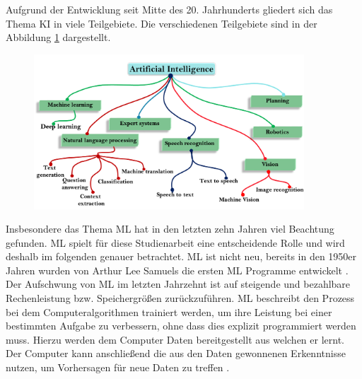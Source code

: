 Aufgrund der Entwicklung seit Mitte des 20. Jahrhunderts gliedert sich das Thema \ac{KI} in viele Teilgebiete.
Die verschiedenen Teilgebiete sind in der Abbildung \ref{fig:KI-Teilgebiete} dargestellt.
\begin{figure}[H]
    \centering
    \includegraphics[width=0.9\textwidth]{images/KI_teilgebiete.png}
    \label{fig:KI-Teilgebiete}
\end{figure}\noindent
Insbesondere das Thema \ac{ML} hat in den letzten zehn Jahren viel Beachtung gefunden. 
\ac{ML} spielt für diese Studienarbeit eine entscheidende Rolle und wird deshalb im folgenden genauer betrachtet.
\newline
\ac{ML} ist nicht neu, bereits in den 1950er Jahren wurden von Arthur Lee Samuels die ersten \ac{ML} Programme entwickelt \autocite[vgl.][S. 5]{judith_hurwitz_machine_2018}.
Der Aufschwung von \ac{ML} im letzten Jahrzehnt ist auf steigende und bezahlbare Rechenleistung bzw. Speichergrößen zurückzuführen.
\ac{ML} beschreibt den Prozess bei dem Computeralgorithmen trainiert werden, um ihre Leistung bei einer bestimmten Aufgabe zu verbessern, ohne dass dies explizit programmiert werden muss.
Hierzu werden dem Computer Daten bereitgestellt aus welchen er lernt.
Der Computer kann anschließend die aus den Daten gewonnenen Erkenntnisse nutzen, um Vorhersagen für neue Daten zu treffen \autocite[vgl.][S. 4]{judith_hurwitz_machine_2018}.
